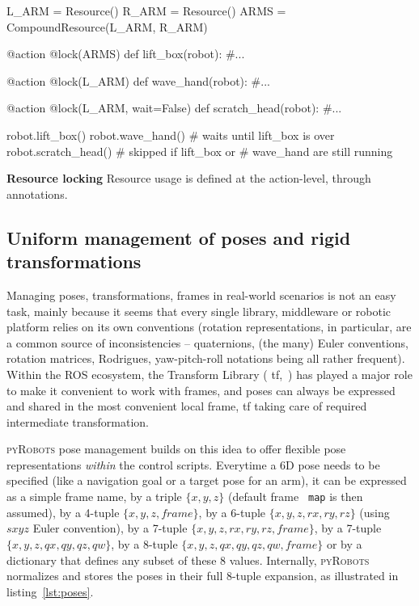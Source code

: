 \documentclass[a4paper, 10pt, conference]{ieeeconf}      %
\newcommand{\pyRobots}{\textsc{pyRobots}}
\begin{document}
\begin{listing}
\begin{pythoncode}
    L_ARM = Resource()
    R_ARM = Resource()
    ARMS = CompoundResource(L_ARM, R_ARM)

    @action
    @lock(ARMS)
    def lift_box(robot):
        #...

    @action
    @lock(L_ARM)
    def wave_hand(robot):
        #...

    @action
    @lock(L_ARM, wait=False)
    def scratch_head(robot):
        #...

    robot.lift_box()
    robot.wave_hand() # waits until lift_box is over
    robot.scratch_head() # skipped if lift_box or
                         # wave_hand are still running

\end{pythoncode}
\caption{\textbf{Resource locking} Resource usage is defined at the
action-level, through annotations.}

\label{lst:resources}
\end{listing}



\subsection{Uniform management of poses and rigid transformations}

Managing poses, transformations, frames in real-world scenarios is not an easy
task, mainly because it seems that every single library, middleware or robotic
platform relies on its own conventions (rotation representations, in particular,
are a common source of inconsistencies -- quaternions, (the many) Euler
conventions, rotation matrices, Rodrigues, yaw-pitch-roll notations being all
rather frequent). Within the ROS ecosystem, the Transform Library ({\sc
tf},~\cite{foote2013tf}) has played a major role to make it convenient to work
with frames, and poses can always be expressed and shared in the most convenient
local frame, {\sc tf} taking care of required intermediate transformation.

\pyRobots{} pose management builds on this idea to offer flexible pose
representations \emph{within} the control scripts. Everytime a 6D pose needs to
be specified (like a navigation goal or a target pose for an arm), it can be
expressed as a simple frame name, by a triple $\{x, y, z\}$ (default frame {\tt
map} is then assumed), by a 4-tuple $\{x, y, z, frame\}$, by a 6-tuple $\{x, y,
z, rx, ry, rz\}$ (using $sxyz$ Euler convention), by a 7-tuple $\{x, y, z, rx,
ry, rz, frame\}$, by a 7-tuple $\{x, y, z, qx, qy, qz, qw\}$, by a 8-tuple $\{x,
y, z, qx, qy, qz, qw, frame\}$ or by a dictionary that defines any subset of
these 8 values.  Internally, \pyRobots{} normalizes and stores the poses in
their full 8-tuple expansion, as illustrated in listing~\ref{lst:poses}.
\end{document}

